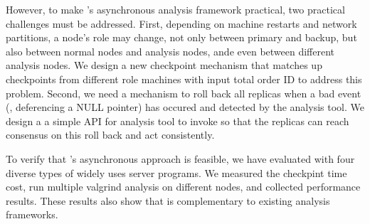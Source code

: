 However, to make \xxx's asynchronous analysis framework practical, two 
practical challenges must be addressed. First, depending on machine restarts 
and network partitions, a node's role may change, not only between primary and 
backup, but also between normal nodes and analysis nodes, ande even between 
different analysis nodes. We design a new checkpoint mechanism that matches up 
checkpoints from different role machines with input total order ID to address 
this problem. Second, we need a mechanism to roll back all replicas when a bad 
event (\eg, deferencing a NULL pointer) has occured and detected by the 
analysis tool. We design a a simple API for analysis tool to invoke so that the 
replicas can reach consensus on this roll back and act consistently.

To verify that \xxx's asynchronous approach is feasible, we have evaluated 
\xxx with four diverse types of widely uses server programs. We measured the 
checkpint time cost, run multiple valgrind analysis on different nodes, and 
collected performance results. These results also show that \xxx is 
complementary to existing analysis frameworks.



